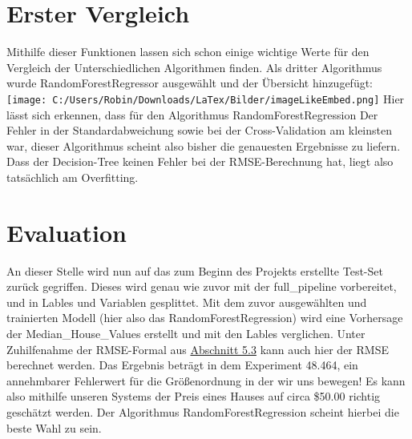\section{Erster Vergleich}
\label{ErsterVergleich}
Mithilfe dieser Funktionen lassen sich schon einige wichtige Werte für den Vergleich der Unterschiedlichen Algorithmen finden.
Als dritter Algorithmus wurde RandomForestRegressor ausgewählt und der Übersicht hinzugefügt:
\newline
\texttt{[image: C:/Users/Robin/Downloads/LaTex/Bilder/imageLikeEmbed.png]}
\newline
Hier lässt sich erkennen, dass für den Algorithmus RandomForestRegression Der Fehler in der Standardabweichung sowie bei der Cross-Validation am kleinsten war, dieser Algorithmus scheint also bisher die genauesten Ergebnisse zu liefern. Dass der Decision-Tree keinen Fehler bei der RMSE-Berechnung hat, liegt also tatsächlich am Overfitting.


\section{Evaluation}
\label{evaluation}
An dieser Stelle wird nun auf das zum Beginn des Projekts erstellte Test-Set zurück gegriffen. Dieses wird genau wie zuvor mit der full\_pipeline vorbereitet, und in Lables und Variablen gesplittet. Mit dem zuvor ausgewählten und trainierten Modell (hier also das RandomForestRegression) wird eine Vorhersage der Median\_House\_Values erstellt und mit den Lables verglichen. Unter Zuhilfenahme der RMSE-Formal aus \hyperlink{datensatz}{Abschnitt 5.3} kann auch hier der RMSE berechnet werden. Das Ergebnis beträgt in dem Experiment 48.464, ein annehmbarer Fehlerwert für die Größenordnung in der wir uns bewegen! Es kann also mithilfe unseren Systems der Preis eines Hauses auf circa \$50.00 richtig geschätzt werden. 
Der Algorithmus RandomForestRegression scheint hierbei die beste Wahl zu sein.


